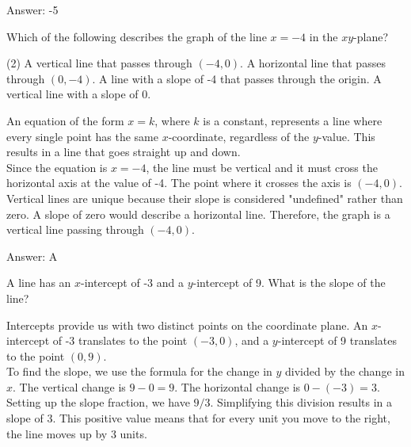 \documentclass[11pt,paper=a4,answers]{exam}
\begin{document}
\begin{questions}
\begin{solution}
\vspace{15pt}
Answer: \colorbox{yellow!100}{-5}
\end{solution}

\question
Which of the following describes the graph of the line $x = -4$ in the $xy$-plane?
\begin{tasks}(2)
    \task A vertical line that passes through $(-4, 0)$.
    \task A horizontal line that passes through $(0, -4)$.
    \task A line with a slope of -4 that passes through the origin.
    \task A vertical line with a slope of 0.
\end{tasks}

\begin{solution}
An equation of the form $x = k$, where $k$ is a constant, represents a line where every single point has the same $x$-coordinate, regardless of the $y$-value. This results in a line that goes straight up and down.
\\[10pt]
Since the equation is $x = -4$, the line must be vertical and it must cross the horizontal axis at the value of -4. The point where it crosses the axis is $(-4, 0)$. 
\\[10pt]
Vertical lines are unique because their slope is considered "undefined" rather than zero. A slope of zero would describe a horizontal line. Therefore, the graph is a vertical line passing through $(-4, 0)$.

\vspace{15pt}
Answer: \colorbox{yellow!100}{A}
\end{solution}

\question
A line has an $x$-intercept of -3 and a $y$-intercept of 9. What is the slope of the line?

\begin{solution}
Intercepts provide us with two distinct points on the coordinate plane. An $x$-intercept of -3 translates to the point $(-3, 0)$, and a $y$-intercept of 9 translates to the point $(0, 9)$.
\\[10pt]
To find the slope, we use the formula for the change in $y$ divided by the change in $x$. The vertical change is $9 - 0 = 9$. The horizontal change is $0 - (-3) = 3$. 
\\[10pt]
Setting up the slope fraction, we have $9 / 3$. Simplifying this division results in a slope of 3. This positive value means that for every unit you move to the right, the line moves up by 3 units.


\end{solution}
\end{questions}
\end{document}
